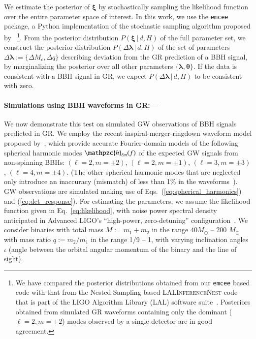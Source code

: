 \documentclass[prl,preprintnumbers,twocolumn,eqsecnum,floatfix,a4paper,nofootinbib,superscriptaddress]{revtex4}
\newcommand{\h}{\mathpzc{h}}
\newcommand{\blambda}{\bm{\lambda}}
\newcommand{\btheta}{\bm{\theta}}
\newcommand{\bxi}{\bm{\xi}}
\begin{document}
We estimate the posterior of $\bxi$ by stochastically sampling the likelihood function over the entire parameter space of interest. In this work, we use the \texttt{emcee}~\cite{foreman2013emcee} package, a Python implementation of the 
stochastic sampling algorithm proposed by \cite{goodman2010ensemble}~\footnote{We have compared the posterior distributions obtained from our \texttt{emcee} based code with that from the Nested-Sampling based \textsc{LALInferenceNest} code~\cite{Veitch:2009hd} that is part of the LIGO Algorithm Library (LAL) software suite~\cite{LALsuite}. Posteriors obtained from simulated GR waveforms containing only the dominant ($\ell = 2, m = \pm 2$) modes observed by a single detector are in good agreement.}. From the posterior distribution $P(\bxi \, | \, d, H)$ of the full parameter set, we construct the posterior distribution $P(\Delta \blambda \, | \, d, H)$ of the set of parameters $\Delta \blambda := \{\Delta M_c, \Delta q\}$ describing deviation from the GR prediction of a BBH signal, by marginalizing the posterior over all other parameters $\{\blambda, \btheta\}$. If the data is consistent with a BBH signal in GR, we expect $P(\Delta \blambda \, | \, d, H)$ to be consistent with zero. 

\paragraph{Simulations using BBH waveforms in GR:---}
We now demonstrate this test on simulated GW observations of BBH signals predicted in GR. We employ the recent inspiral-merger-ringdown waveform model proposed by~\cite{Mehta:2017jpq}, which provide accurate Fourier-domain models of the following spherical harmonic modes $\h_{\ell m}(f)$ of the expected GW signals from non-spinning BBHs: $(\ell = 2, m = \pm2)$, $(\ell = 2, m=\pm1)$, $(\ell = 3, m=\pm3)$, $(\ell = 4, m = \pm4)$. (The other spherical harmonic modes that are neglected only introduce an inaccuracy (mismatch) of less than 1\% in the waveforms~\cite{Mehta:2017jpq}). 
GW observations are simulated making use of Eqs.~(\ref{eq:spherical_harmonics}) and (\ref{eq:det_response}). For estimating the parameters, we assume the likelihood function given in Eq.~\eqref{eq:likelihood}, with noise power spectral density anticipated in Advanced LIGO's ``high-power, zero-detuning'' configuration~\cite{aLIGOZeroDetHighPower}. We consider binaries with total mass $M := m_1 + m_2$ in the range $40 M_\odot$ -- 200 $M_\odot$ with mass ratio $q := m_2/m_1$ in the range 1/9 -- 1, with varying inclination angles $\iota$ (angle between the orbital angular momentum of the binary and the line of sight). 
\end{document}
